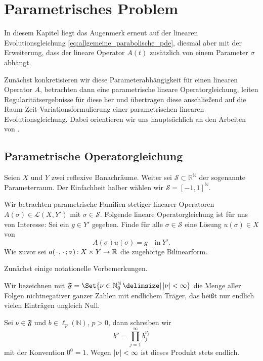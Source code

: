 
\chapter{Parametrisches Problem} %
\label{cha:parametrisches_problem}


In diesem Kapitel liegt das Augenmerk erneut auf der linearen Evolutionsgleichung \eqref{eq:allgemeine_parabolische_pde}, diesmal aber mit der Erweiterung, dass der lineare Operator $A(t)$ zusätzlich von einem Parameter $\sigma$ abhängt.

Zunächst konkretisieren wir diese Parameterabhängigkeit für einen linearen Operator $A$, betrachten dann eine parametrische lineare Operatorgleichung, leiten Regularitätsergebnisse für diese her und übertragen diese anschließend auf die Raum-Zeit-Variationsformulierung einer parametrischen linearen Evolutionsgleichung.
Dabei orientieren wir uns hauptsächlich an den Arbeiten von \textcite{Kunoth:2013ef,Cohen:2010kz}.

\section{Parametrische Operatorgleichung} %
\label{sec:parametrische_operatorgleichung}

Seien $X$ und $Y$ zwei reflexive Banachräume.
Weiter sei $\mathcal S \subset \mathbb{R}^{\mathbb{N}}$ der sogenannte Parameterraum.
Der Einfachheit halber wählen wir $\mathcal S = [-1, 1]^{\mathbb{N}}$.

Wir betrachten parametrische Familien stetiger linearer Operatoren $A(\sigma) \in \mathcal L(X, Y')$ mit $\sigma \in \mathcal S$.
Folgende lineare Operatorgleichung ist für uns von Interesse:
Sei ein $g \in Y'$ gegeben.
Finde für alle $\sigma \in \mathcal S$ eine Lösung $u(\sigma) \in X$ von
\begin{equation}
    \label{eq:allgemeine_parametrische_elliptische_pde}
    A(\sigma) u(\sigma) = g \quad \text{in}~Y'.
\end{equation}
Wie zuvor sei $a({\mkern2mu\cdot\mkern2mu}, {\mkern2mu\cdot\mkern2mu}; \sigma) \colon X \times Y \to \mathbb{R}$ die zugehörige Bilinearform.

Zunächst einige notationelle Vorbemerkungen.
\begin{Bemerkung}
    Wir bezeichnen mit $\mathfrak F = \Set{ \nu \in \mathbb{N}^{\mathbb{N}}_{0} \given \abs{\nu} < \infty }$ die Menge aller Folgen nichtnegativer ganzer Zahlen mit endlichem Träger, das heißt nur endlich vielen Einträgen ungleich Null.

    Sei $\nu \in \mathfrak F$ und $b \in \ell_{p}(\mathbb{N})$, $p > 0$, dann schreiben wir
    \begin{equation}
        b^{\nu} = \prod_{j = 1}^{\infty} b_{j}^{\nu_{j}}
    \end{equation}
    mit der Konvention $0^{0} = 1$.
    Wegen $\lvert\nu\rvert < \infty$ ist dieses Produkt stets endlich.
\end{Bemerkung}

